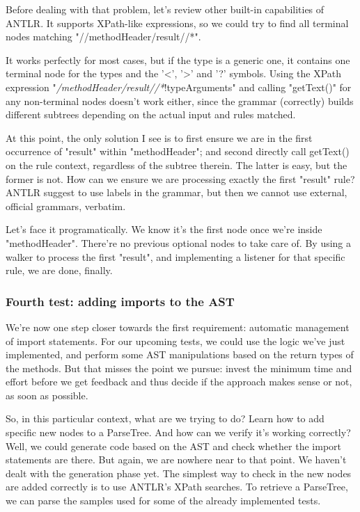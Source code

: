 \documentclass[11pt]{article}
\begin{document}
Before dealing with that problem, let's review other built-in capabilities of ANTLR. It supports XPath-like expressions, so we could try
to find all terminal nodes matching "//methodHeader/result//*". 


It works perfectly for most cases, but if the type is a generic one, it contains one terminal node for the types and the '<', '>' and '?' symbols.
Using the XPath expression "\emph{/methodHeader/result//*}!typeArguments" and calling "getText()" for any non-terminal nodes doesn't work either, since
the grammar (correctly) builds different subtrees depending on the actual input and rules matched.

At this point, the only solution I see is to first ensure we are in the first occurrence of "result" within "methodHeader"; and second directly
call getText() on the rule context, regardless of the subtree therein. The latter is easy, but the former is not. How can we ensure we are processing exactly the
first "result" rule? ANTLR suggest to use labels in the grammar, but then we cannot use external, official grammars, verbatim.

Let's face it programatically. We know it's the first node once we're inside "methodHeader". There're no previous optional nodes to take care
of. By using a walker to process the first "result", and implementing a listener for that specific rule, we are done, finally.

\subsubsection{Fourth test: adding imports to the AST}
\label{sec-1-3-4}

We're now one step closer towards the first requirement: automatic management of import statements.
For our upcoming tests, we could use the logic we've just implemented, and perform some AST manipulations
based on the return types of the methods. But that misses the point we pursue: invest the minimum time and effort
before we get feedback and thus decide if the approach makes sense or not, as soon as possible.

So, in this particular context, what are we trying to do? Learn how to add specific new nodes to a ParseTree. And how
can we verify it's working correctly? Well, we could generate code based on the AST and check whether the import statements
are there. But again, we are nowhere near to that point. We haven't dealt with the generation phase yet.
The simplest way to check in the new nodes are added correctly is to use ANTLR's XPath searches. To retrieve a ParseTree, we
can parse the samples used for some of the already implemented tests.
\end{document}
